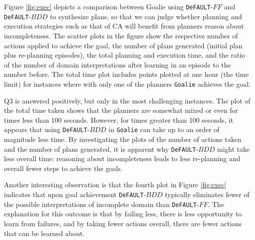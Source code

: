 \documentclass{article}
\def\und#1{\noindent{\bf #1}:}
\def\FFRISKY{{\tt DeFAULT}}
\def\goalie{{\tt Goalie}}
\def\und#1{\medskip{\noindent\bf #1:}}
\begin{document}
\und{On-line Planning and Execution Results} Figure \ref{fig:exec} depicts a comparison between Goalie using \FFRISKY{}-$FF$ and \FFRISKY{}-$BDD$ to synthesize plans, so that we can judge whether planning and execution strategies such as that of CA will benefit from planners reason about incompleteness.  The scatter plots in the figure show the respective number of actions applied to achieve the goal, the number of plans generated (initial plan plus re-planning episodes), the total planning and execution time, and the ratio of the number of domain interpretations after learning in an episode to the number before. The total time plot includes points plotted at one hour (the time limit) for instances where with only one of the planners \goalie{} achieves the goal.

Q3 is answered positively, but only in the most challenging instances.  The plot of the total time taken shows that the planners are somewhat mixed or even for times less than 100 seconds.  However, for times greater than 100 seconds, it appears that using \FFRISKY-$BDD$ in \goalie{} can take up to an order of magnitude less time.  By investigating the plots of the number of actions taken and the number of plans generated, it is apparent why \FFRISKY-$BDD$ might take less overall time: reasoning about incompleteness leads to less re-planning and overall fewer steps to achieve the goals.  

Another interesting observation is that the fourth plot in Figure \ref{fig:exec} indicates that upon goal achievement  \FFRISKY-$BDD$ typically eliminates fewer of the possible interpretations of incomplete domain than \FFRISKY-$FF$.  The explanation for this outcome is that by failing less, there is less opportunity to learn from failures, and by taking fewer actions overall, there are fewer actions that can be learned about. 
\end{document}
